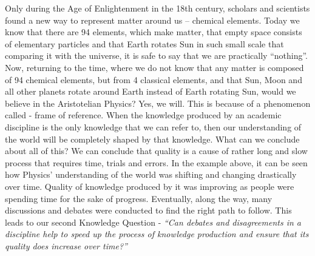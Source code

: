 \documentclass[12pt,a4paper]{article}
\begin{document}
Only during the Age of Enlightenment in the 18th century, scholars and scientists found a new way to represent matter around us – chemical elements. Today we know that there are 94 elements\cite{table}, which make matter, that empty space consists of elementary particles and that Earth rotates Sun in such small scale that comparing it with the universe, it is safe to say that we are practically ``nothing''. Now, returning to the time, where we do not know that any matter is composed of 94 chemical elements, but from 4 classical elements, and that Sun, Moon and all other planets rotate around Earth instead of Earth rotating Sun, would we believe in the Aristotelian Physics? Yes, we will. This is because of a phenomenon called - frame of reference. When the knowledge produced by an academic discipline is the only knowledge that we can refer to, then our understanding of the world will be completely shaped by that knowledge. What can we conclude about all of this? We can conclude that quality is a cause of rather long and slow process that requires time, trials and errors. In the example above, it can be seen how Physics’ understanding of the world was shifting and changing drastically over time. Quality of knowledge produced by it was improving as people were spending time for the sake of progress. Eventually, along the way, many discussions and debates were conducted to find the right path to follow. This leads to our second Knowledge Question - \textit{``Can debates and disagreements in a discipline help to speed up the process of knowledge production and ensure that its quality does increase over time?''}\\
\end{document}
